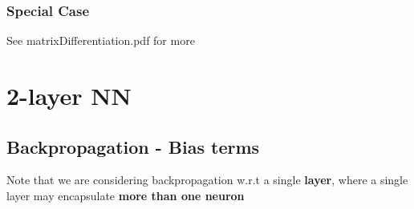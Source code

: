 \documentclass{article}
\begin{document}
\subsubsection{Special Case}
See matrixDifferentiation.pdf for more

\newpage
\section{2-layer NN}

\subsection{Backpropagation - Bias terms}
Note that we are considering backpropagation w.r.t a single \textbf{layer}, where a single layer may encapsulate \textbf{more than one neuron}
\end{document}
